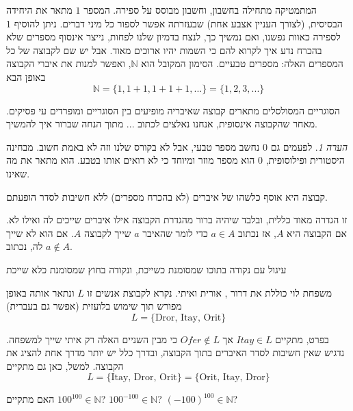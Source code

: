 \documentclass[
  hebrew,
  12pt,
  a4paper,
  oneside]{book}
\theoremstyle{definition}
\theoremstyle{remark}
\theoremstyle{plain}
\theoremstyle{remark}
\newtheorem*{remark}{הערה}
\begin{document}
המתמטיקה מתחילה בחשבון, וחשבון מבוסס על ספירה. המספר \(1\) מתאר את
היחידה הבסיסית, (לצורך העניין אצבע אחת) שבעזרתה אפשר לספור כל מיני
דברים. ניתן להוסיף \(1\) לספירה כאוות נפשנו, ואם נמשיך כך, לנצח בדמיון
שלנו לפחות, נייצר אינסוף מספרים שלא בהכרח נדע איך לקרוא להם כי השמות
יהיו ארוכים מאוד. אבל יש שם לקבוצה של כל המספרים האלה: מספרים טבעיים.
הסימון המקובל הוא \(\mathbb{N}\), ואפשר למנות את איברי הקבוצה באופן הבא
\[\mathbb{N}=\{1,1+1,1+1+1,...\}=\{1,2,3,...\}\]

הסוגריים המסולסלים מתארים קבוצה שאיבריה מופיעים בין הסוגריים ומופרדים עי
פסיקים. מאחר שהקבוצה אינסופית, אנחנו נאלצים לכתוב ... מתוך הנחה שברור
איך להמשיך.

\begin{remark}
לפעמים גם \(0\) נחשב מספר טבעי, אבל לא בקורס שלנו וזה לא באמת חשוב.
מבחינה היסטורית ופילוסופית, \(0\) הוא מספר מוזר ומיוחד כי לא רואים אותו
בטבע. הוא מתאר את מה שאינו.
\end{remark}

\begin{definition}

קבוצה היא אוסף כלשהו של איברים (לא בהכרח מספרים) ללא חשיבות לסדר הופעתם.

\end{definition}

זו הגדרה מאוד כללית, ובלבד שיהיה ברור מהגדרת הקבוצה אילו איברים שייכים
לה ואילו לא. אם הקבוצה היא \(A\), אז נכתוב \(a\in A\) כדי לומר שהאיבר
\(a\) שייך לקבוצה \(A\). אם הוא לא שייך לה, נכתוב \(a\notin A\).

עיגול עם נקודה בתוכו שמסומנת כשייכת, ונקודה בחוץ שמסומנת כלא שייכת

\begin{example}

משפחת לוי כוללת את דרור , אורית ואיתי. נקרא לקבוצת אנשים זו \(L\) ונתאר
אותה באופן מפורש תוך שימוש בלועזית (אפשר גם בעברית)
\[L=\{\text{{Dror, Itay, Orit}}\}\]

בפרט, מתקיים \(Itay \in L\) אך \(Ofer \notin L\) כי מבין השניים האלה רק
איתי שייך למשפחה. נדגיש שאין חשיבות לסדר האיברים בתוך הקבוצה, ובדרך כלל
יש יותר מדרך אחת להציג את הקבוצה. למשל, כאן גם מתקיים
\[L=\{\text{{Itay, Dror, Orit}}\}=\{\text{{Orit, Itay, Dror}}\}\]

\end{example}

\begin{exercise}

האם מתקיים \(100^{100}\in\mathbb{N}\)? \(100^{-100}\in\mathbb{N}\)?
\((-100)^{100}\in\mathbb{N}\)?

\end{exercise}
\end{document}
